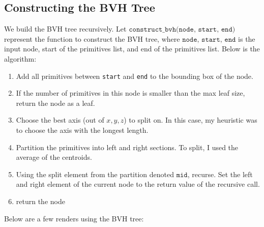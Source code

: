\documentclass{article}
\begin{document}
\subsection{Constructing the BVH Tree}
We build the BVH tree recursively. Let $\texttt{construct\_bvh(node, start, end)}$ represent the function to construct the BVH tree, where $\texttt{node, start, end}$ is the input node, start of the primitives list, and end of the primitives list. Below is the algorithm:
\begin{enumerate}
    \item Add all primitives between \texttt{start} and \texttt{end} to the bounding box of the node.
    \item If the number of primitives in this node is smaller than the max leaf size, return the node as a leaf.
    \item Choose the best axis (out of $x, y, z$) to split on. In this case, my heuristic was to choose the axis with the longest length.
    \item Partition the primitives into left and right sections. To split, I used the average of the centroids.
    \item Using the split element from the partition denoted $\texttt{mid}$, recurse. Set the left and right element of the current node to the return value of the recursive call.
    \item return the node
\end{enumerate}
Below are a few renders using the BVH tree:
\end{document}
